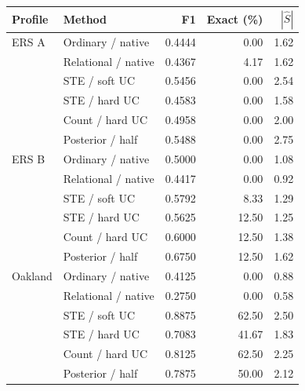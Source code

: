 \begin{tabular}{llrrr}
\toprule
Profile & Method & F1 & Exact (\%) & $|\widehat S|$\\
\midrule
ERS A & Ordinary / native & 0.4444 & 0.00 & 1.62\\
 & Relational / native & 0.4367 & 4.17 & 1.62\\
 & STE / soft UC & 0.5456 & 0.00 & 2.54\\
 & STE / hard UC & 0.4583 & 0.00 & 1.58\\
 & Count / hard UC & 0.4958 & 0.00 & 2.00\\
 & Posterior / half & 0.5488 & 0.00 & 2.75\\
\midrule
ERS B & Ordinary / native & 0.5000 & 0.00 & 1.08\\
 & Relational / native & 0.4417 & 0.00 & 0.92\\
 & STE / soft UC & 0.5792 & 8.33 & 1.29\\
 & STE / hard UC & 0.5625 & 12.50 & 1.25\\
 & Count / hard UC & 0.6000 & 12.50 & 1.38\\
 & Posterior / half & 0.6750 & 12.50 & 1.62\\
\midrule
Oakland & Ordinary / native & 0.4125 & 0.00 & 0.88\\
 & Relational / native & 0.2750 & 0.00 & 0.58\\
 & STE / soft UC & 0.8875 & 62.50 & 2.50\\
 & STE / hard UC & 0.7083 & 41.67 & 1.83\\
 & Count / hard UC & 0.8125 & 62.50 & 2.25\\
 & Posterior / half & 0.7875 & 50.00 & 2.12\\
\bottomrule
\end{tabular}

